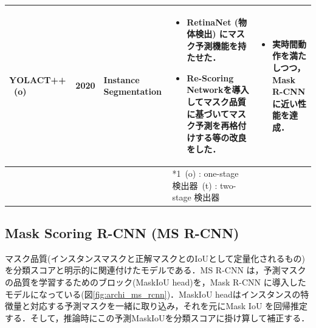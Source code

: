 \documentclass[twocolumn]{jsarticle} %
\begin{document}
\begin{table}
\begin{center}
\begin{tabularx}{\linewidth}{XcXp{7cm}X}
            YOLACT++ \cite{BZXL20} \ (o)\footnote[1] & 2020 & Instance Segmentation & 
            \begin{itemize}
                \vspace{-0.7\baselineskip}
                \setlength{\leftskip}{-3mm}
                \item RetinaNet (物体検出) にマスク予測機能を持たせた．
                \item Re-Scoring Networkを導入してマスク品質に基づいてマスク予測を再格付けする等の改良をした．
            \end{itemize}
            &
            \begin{itemize}
                \vspace{-0.7\baselineskip}
                \setlength{\leftskip}{-3mm}
                \item 実時間動作を満たしつつ，Mask R-CNN に近い性能を達成．
            \end{itemize}
            \\

            \bottomrule
            &  &  & *1\ (o) : one-stage 検出器\quad *2\ (t) : two-stage 検出器 &  \\
        \end{tabularx}
    \end{center}
\end{table}%

\subsection{Mask Scoring R-CNN (MS R-CNN) \cite{HHGHW19}}
マスク品質(インスタンスマスクと正解マスクとのIoUとして定量化されるもの)を分類スコアと明示的に関連付けたモデルである．MS R-CNN は，予測マスクの品質を学習するためのブロック(MaskIoU head)を，Mask R-CNN\cite{HGDG17} に導入したモデルになっている(図\ref{fig:archi_ms_rcnn})．MaskIoU headはインスタンスの特徴量と対応する予測マスクを一緒に取り込み，それを元にMask IoU を回帰推定する．そして，推論時にこの予測MaskIoUを分類スコアに掛け算して補正する．
\end{document}
